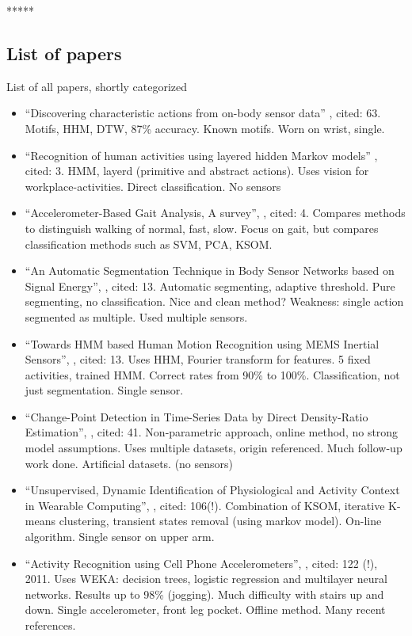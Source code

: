
*****
\subsection{List of papers}
List of all papers, shortly categorized
\begin{itemize}
  \item ``Discovering characteristic actions from on-body sensor data'' \cite{minnen2006discovering}, cited: 63. Motifs, HHM, DTW, 87\% accuracy. Known motifs. Worn on wrist, single.
  \item ``Recognition of human activities using layered hidden Markov models'' \cite{perdikis2008recognition}, cited: 3. HMM, layerd (primitive and abstract actions). Uses vision for workplace-activities. Direct classification. No sensors
  \item ``Accelerometer-Based Gait Analysis, A survey'', \cite{derawi2010accelerometer}, cited: 4. Compares methods to distinguish walking of normal, fast, slow. Focus on gait, but compares classification methods such as SVM, PCA, KSOM.
  \item ``An Automatic Segmentation Technique in Body Sensor Networks based on Signal Energy'', \cite{guenterberg2009automatic}, cited: 13. Automatic segmenting, adaptive threshold. Pure segmenting, no classification. Nice and clean method? Weakness: single action segmented as multiple. Used multiple sensors.
  \item ``Towards HMM based Human Motion Recognition using MEMS Inertial Sensors'', \cite{shi2009towards}, cited: 13. Uses HHM, Fourier transform for features. 5 fixed activities, trained HMM. Correct rates from 90\% to 100\%. Classification, not just segmentation. Single sensor.
  \item ``Change-Point Detection in Time-Series Data by Direct Density-Ratio Estimation'', \cite{kawahara2009change}, cited: 41. Non-parametric approach, online method, no strong model assumptions. Uses multiple datasets, origin referenced. Much follow-up work done. Artificial datasets. (no sensors)
  \item ``Unsupervised, Dynamic Identification of Physiological and Activity Context in Wearable Computing'', \cite{krause2003unsupervised}, cited: 106(!). Combination of KSOM, iterative K-means clustering, transient states removal (using markov model). On-line algorithm. Single sensor on upper arm.
  \item ``Activity Recognition using Cell Phone Accelerometers'', \cite{kwapisz2011activity}, cited: 122 (!), 2011. Uses WEKA: decision trees, logistic regression and multilayer neural networks. Results up to 98\% (jogging). Much difficulty with stairs up and down. Single accelerometer, front leg pocket. Offline method. Many recent references.

\end{itemize}
